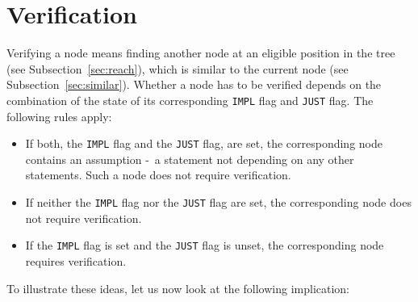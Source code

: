 \documentclass[british]{article}
\newcommand\prv{bc}
\newcommand\m[1]{\texttt{#1}}
\begin{document}

\pagebreak{}

\section{Verification}\label{sec:verify}

\textcolor{dartmouthgreen}{Verifying a node means finding another node at an
eligible position in the tree (see Subsection~\ref{sec:reach}), which is similar
to the current node (see Subsection~\ref{sec:similar})}.  Whether a node has to
be verified depends on the combination of the state of its corresponding
\texttt{IMPL} flag and \texttt{JUST} flag. The following rules apply:

\begin{itemize}
	\item
		If both, the \texttt{IMPL} flag and the \texttt{JUST} flag, are set, the
		corresponding node contains an assumption -\ a statement not depending
		on any other statements. Such a node does not require verification.
	\item
		If neither the \texttt{IMPL} flag nor the \texttt{JUST} flag are set,
		the corresponding node does not require verification.
	\item
		If the \texttt{IMPL} flag is set and the \texttt{JUST} flag is unset,
		the corresponding node requires verification.
\end{itemize}

To illustrate these ideas, let us now look at the following implication:
\end{document}
